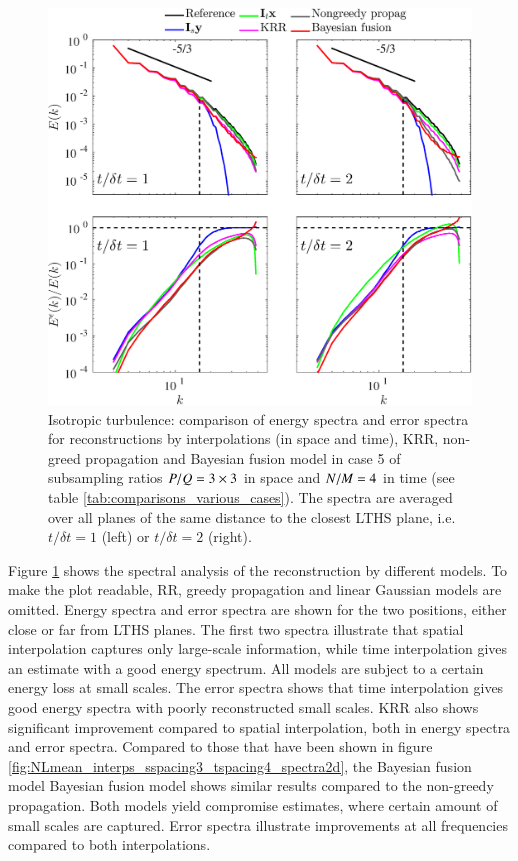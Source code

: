 \begin{figure}
\begin{center}
\includegraphics[width = 0.8\columnwidth]{./images/comparisons/isotropic/spectra_sspacing3_tspacing4.eps}
\caption{\label{fig:spectra_sspacing3_tspacing4} Isotropic turbulence: comparison of energy spectra and error spectra for reconstructions by interpolations (in space and time), KRR, non-greed propagation and Bayesian fusion model in case 5 of subsampling ratios $ P/Q = 3 \times 3 $ in space and $ N/M = 4 $ in time (see table \ref{tab:comparisons_various_cases}). The spectra are averaged over all planes of the same distance to the closest LTHS plane, i.e. $ t/\delta t = 1 $ (left) or $ t/\delta t = 2 $ (right).}
\end{center}
\end{figure}

Figure \ref{fig:spectra_sspacing3_tspacing4} shows the spectral analysis of the reconstruction by different models. To make the plot readable, RR, greedy propagation and linear Gaussian models are omitted. Energy spectra and error spectra are shown for the two positions, either close or far from LTHS planes. The first two spectra illustrate that spatial interpolation captures only large-scale information, while time interpolation gives an estimate with a good energy spectrum. All models are subject to a certain energy loss at small scales. The error spectra shows that time interpolation gives good energy spectra with poorly reconstructed small scales. KRR also shows significant improvement compared to spatial interpolation, both in energy spectra and error spectra. Compared to those that have been shown in figure \ref{fig:NLmean_interps_sspacing3_tspacing4_spectra2d}, the Bayesian fusion model Bayesian fusion model shows similar results compared to the non-greedy propagation. Both models yield compromise estimates, where certain amount of small scales are captured. Error spectra illustrate improvements at all frequencies compared to both interpolations.

